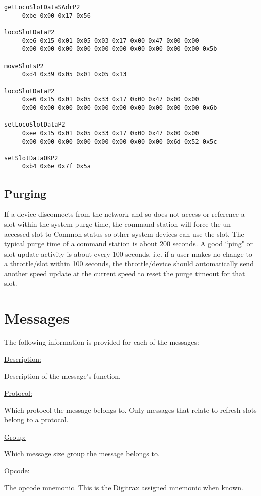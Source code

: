 \begin{verbatim}
getLocoSlotDataSAdrP2
     0xbe 0x00 0x17 0x56 
     
locoSlotDataP2
     0xe6 0x15 0x01 0x05 0x03 0x17 0x00 0x47 0x00 0x00 
     0x00 0x00 0x00 0x00 0x00 0x00 0x00 0x00 0x00 0x00 0x5b 

moveSlotsP2
     0xd4 0x39 0x05 0x01 0x05 0x13 

locoSlotDataP2
     0xe6 0x15 0x01 0x05 0x33 0x17 0x00 0x47 0x00 0x00 
     0x00 0x00 0x00 0x00 0x00 0x00 0x00 0x00 0x00 0x00 0x6b 

setLocoSlotDataP2
     0xee 0x15 0x01 0x05 0x33 0x17 0x00 0x47 0x00 0x00 
     0x00 0x00 0x00 0x00 0x00 0x00 0x00 0x00 0x6d 0x52 0x5c 

setSlotDataOKP2
     0xb4 0x6e 0x7f 0x5a 
\end{verbatim}
\normalsize

\subsection{Purging}
If a device disconnects from the network and so does not access or reference a slot within the system purge time, the command station will force the un-accessed slot to \gls{Common} status so other system devices can use the slot. The typical purge time of a command station is about 200 seconds. A good ``ping" or slot update activity is about every 100 seconds, i.e. if a user makes no change to a throttle/slot within 100 seconds, the throttle/device should automatically send another speed update at the current speed to reset the purge timeout for that slot.

\newpage
\section{Messages}

The following information is provided for each of the messages:

\underline{Description:}

Description of the message's function.

\underline{Protocol:}

Which protocol the message belongs to. Only messages that relate to refresh slots belong to a protocol.

\underline{Group:}

Which message size group the message belongs to.

\underline{Opcode:}

The opcode mnemonic. This is the Digitrax assigned mnemonic when known.


